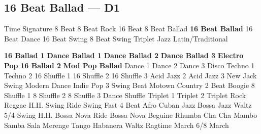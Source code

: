 \subsection{16 Beat Ballad --- \UiKey{\II}\UiKey{\MET}D1}
Time Signature
8 Beat
8 Beat Rock
16 Beat
8 Beat Ballad
\textbf{16 Beat Ballad}
16 Beat Dance
16 Beat Swing
8 Beat Swing
Triplet
Jazz
Latin/Traditional





























\textbf{16 Ballad 1}
\textbf{Dance Ballad 1}
\textbf{Dance Ballad 2}
\textbf{Dance Ballad 3}
\textbf{Electro Pop}
\textbf{16 Ballad 2}
\textbf{Mod Pop Ballad}
Dance 1
Dance 2
Dance 3
Disco
Techno 1
Techno 2
16 Shuffle 1
16 Shuffle 2
16 Shuffle 3
Acid Jazz 2
Acid Jazz 3
New Jack Swing
Modern Dance
Indie Pop 3
Swing Beat
Motown
Country 2 Beat
Boogie
8 Shuffle 1
8 Shuffle 2
8 Shuffle 3
Dance Shuffle
Triplet 1
Triplet 2
Triplet Rock
Reggae
H.H. Swing
Ride Swing
Fast 4 Beat
Afro Cuban
Jazz Bossa
Jazz Waltz
5/4 Swing
H.H. Bossa Nova
Ride Bossa Nova
Beguine
Rhumba
Cha Cha
Mambo
Samba
Sala
Merenge
Tango
Habanera
Waltz
Ragtime
March
6/8 March
